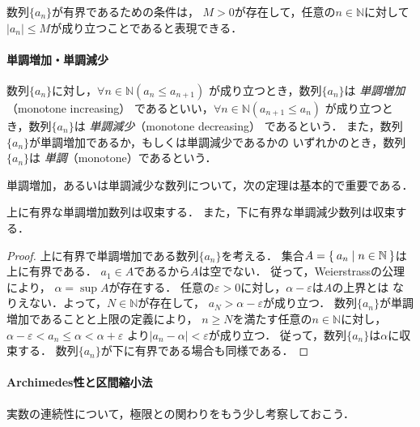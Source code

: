      数列$\{a_n \}$が有界であるための条件は，
     $M>0$が存在して，任意の$n \in \mathbb{N}$に対して
     $\lvert a_n \rvert \leq M$が成り立つことであると表現できる．

    \paragraph{単調増加・単調減少}
     数列$\{ a_n \}$に対し，$\forall n \in \mathbb{N} ( a_n \leq a_{n+1})$
     が成り立つとき，数列$\{a_n \}$は
     \emph{単調増加}（monotone increasing）
     であるといい，$\forall n \in \mathbb{N} (a _{n+1} \leq a_n)$
     が成り立つとき，数列$\{ a_n \}$は
     \emph{単調減少}（monotone decreasing）
     であるという．
     また，数列$\{ a_n \}$が単調増加であるか，もしくは単調減少であるかの
     いずれかのとき，数列$\{a_n \}$は
     \emph{単調}（monotone）であるという．

     単調増加，あるいは単調減少な数列について，次の定理は基本的で重要である．
     \begin{thm} \label{thm:yukaitantyou}
       上に有界な単調増加数列は収束する．
       また，下に有界な単調減少数列は収束する．
     \end{thm}
     \begin{proof}
       上に有界で単調増加である数列$\{ a_n \}$を考える．
       集合$A = \Set { a_n \mid n \in \mathbb{N}}$は上に有界である．
       $a_1 \in A$であるから$A$は空でない．
       従って，Weierstrassの公理により，
       $\alpha = \sup A$が存在する．
       任意の$\varepsilon >0$に対し，$\alpha - \varepsilon$は$A$の上界とは
       なりえない．よって，$N \in \mathbb{N}$が存在して，
       $a_N > \alpha - \varepsilon$が成り立つ．
       数列$\{ a_n \}$が単調増加であることと上限の定義により，
       $n \geq N$を満たす任意の$n \in \mathbb{N}$に対し，
       $\alpha - \varepsilon < a_n \leq \alpha < \alpha + \varepsilon$
       より$\lvert a_n - \alpha \rvert < \varepsilon$が成り立つ．
       従って，数列$\{ a_n \}$は$\alpha$に収束する．
       数列$\{ a_n \}$が下に有界である場合も同様である．
     \end{proof}

    \paragraph{Archimedes性と区間縮小法}
     実数の連続性について，極限との関わりをもう少し考察しておこう．

